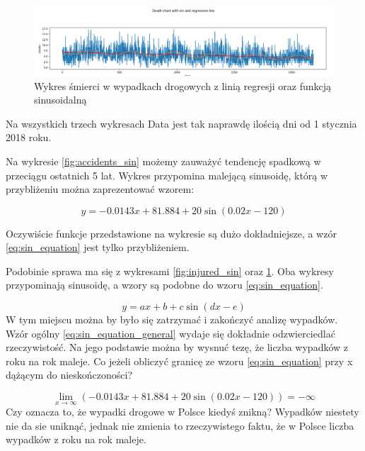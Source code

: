 \documentclass{article}
\begin{document}
\begin{figure}[h]
    \flushleft
    \includegraphics[width=1\textwidth]{visualization/death_sin.png}
    \caption{Wykres śmierci w wypadkach drogowych z linią regresji oraz funkcją sinusoidalną}
    \label{fig:death_sin}
\end{figure}

Na wszystkich trzech wykresach Data jest tak naprawdę ilością dni od 1 stycznia 2018 roku. 

Na wykresie \ref{fig:accidents_sin} możemy zauważyć tendencję spadkową w przeciągu ostatnich 5 lat. Wykres przypomina malejącą sinusoidę, którą w przybliżeniu można zaprezentować wzorem:

\begin{equation} \label{eq:sin_equation}
    y = -0.0143x + 81.884 + 20\sin(0.02x - 120) 
\end{equation}

Oczywiście funkcje przedstawione na wykresie są dużo dokładniejsze, a wzór \ref{eq:sin_equation} jest tylko przybliżeniem.

Podobinie sprawa ma się z wykresami \ref{fig:injured_sin} oraz \ref{fig:death_sin}. Oba wykresy przypominają sinusoidę, a wzory są podobne do wzoru \ref{eq:sin_equation}.

\begin{equation} \label{eq:sin_equation_general}
    y = ax + b + c\sin(dx -e) 
\end{equation}
W tym miejscu można by było się zatrzymać i zakończyć analizę wypadków. Wzór ogólny \ref*{eq:sin_equation_general} wydaje się dokładnie odzwierciedlać rzeczywistość.
Na jego podstawie można by wysnuć tezę, że liczba wypadków z roku na rok maleje.
Co jeżeli obliczyć granicę ze wzoru \ref*{eq:sin_equation} przy x dążącym do nieskończoności?

\begin{equation} \label{eq:limit_sin}
    \lim_{x\to\infty}(-0.0143x + 81.884 + 20\sin(0.02x - 120))=-\infty
\end{equation}
Czy oznacza to, że wypadki drogowe w Polsce kiedyś znikną? Wypadków niestety nie da sie uniknąć, jednak nie zmienia to rzeczywistego faktu, że w Polsce 
liczba wypadków z roku na rok maleje. 
\end{document}
